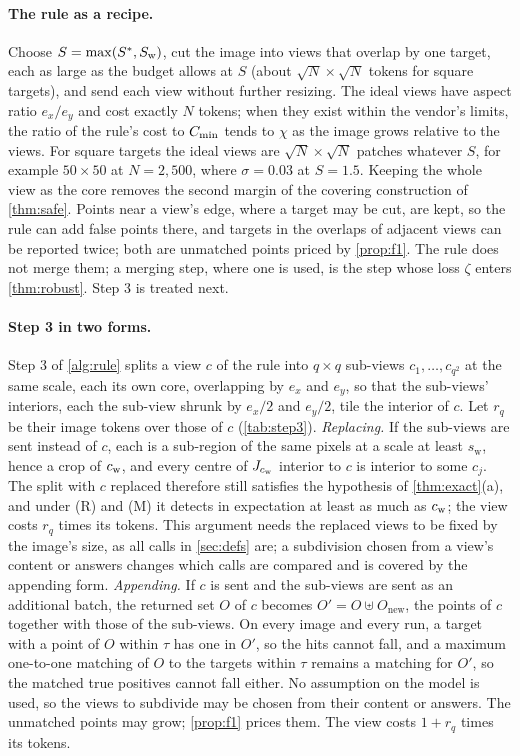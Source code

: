 \paragraph{The rule as a recipe.} Choose $S = \max(S^\ast, S_{\mathrm{w}})$, cut the image into views that overlap by one target, each as large as the budget allows at $S$ (about $\sqrt N \times \sqrt N$ tokens for square targets), and send each view without further resizing. The ideal views have aspect ratio $e_x/e_y$ and cost exactly $N$ tokens; when they exist within the vendor's limits, the ratio of the rule's cost to $C_{\min}$ tends to $\chi$ as the image grows relative to the views. For square targets the ideal views are $\sqrt N \times \sqrt N$ patches whatever $S$, for example $50 \times 50$ at $N = 2{,}500$, where $\sigma = 0.03$ at $S = 1.5$. Keeping the whole view as the core removes the second margin of the covering construction of \cref{thm:safe}. Points near a view's edge, where a target may be cut, are kept, so the rule can add false points there, and targets in the overlaps of adjacent views can be reported twice; both are unmatched points priced by \cref{prop:f1}. The rule does not merge them; a merging step, where one is used, is the step whose loss $\zeta$ enters \cref{thm:robust}. Step 3 is treated next.

\paragraph{Step 3 in two forms.}\label{sec:step3-proof} Step 3 of \cref{alg:rule} splits a view $c$ of the rule into $q \times q$ sub-views $c_1, \dots, c_{q^2}$ at the same scale, each its own core, overlapping by $e_x$ and $e_y$, so that the sub-views' interiors, each the sub-view shrunk by $e_x/2$ and $e_y/2$, tile the interior of $c$. Let $r_q$ be their image tokens over those of $c$ (\cref{tab:step3}).
\emph{Replacing.} If the sub-views are sent instead of $c$, each is a sub-region of the same pixels at a scale at least $s_{\mathrm{w}}$, hence a crop of $c_{\mathrm{w}}$, and every centre of $J_{c_{\mathrm{w}}}$ interior to $c$ is interior to some $c_j$. The split with $c$ replaced therefore still satisfies the hypothesis of \cref{thm:exact}(a), and under (R) and (M) it detects in expectation at least as much as $c_{\mathrm{w}}$; the view costs $r_q$ times its tokens. This argument needs the replaced views to be fixed by the image's size, as all calls in \cref{sec:defs} are; a subdivision chosen from a view's content or answers changes which calls are compared and is covered by the appending form.
\emph{Appending.} If $c$ is sent and the sub-views are sent as an additional batch, the returned set $O$ of $c$ becomes $O' = O \uplus O_{\mathrm{new}}$, the points of $c$ together with those of the sub-views. On every image and every run, a target with a point of $O$ within $\tau$ has one in $O'$, so the hits cannot fall, and a maximum one-to-one matching of $O$ to the targets within $\tau$ remains a matching for $O'$, so the matched true positives cannot fall either. No assumption on the model is used, so the views to subdivide may be chosen from their content or answers. The unmatched points may grow; \cref{prop:f1} prices them. The view costs $1 + r_q$ times its tokens.


